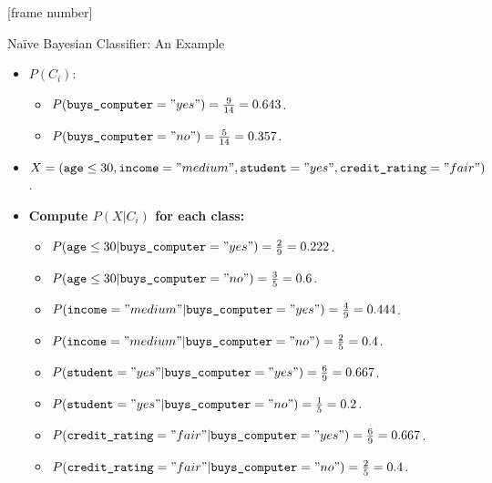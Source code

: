 \documentclass[aspectratio=169,t,table]{beamer}
\begin{document}
  {
    [frame number]
    \begin{frame}{Naïve Bayesian Classifier: An Example}
      \begin{itemize}
        \item $P(C_i)$:
        \begin{itemize}
          \item $P(\texttt{buys\_computer} = "yes") = \frac{9}{14} = 0.643$.
          \item $P(\texttt{buys\_computer} = "no") = \frac{5}{14} = 0.357$.
        \end{itemize}
        \item $X = (\texttt{age} \leq 30 , \texttt{income} = "medium", \texttt{student} = "yes", \texttt{credit\_rating} = "fair")$.
        \item \textbf{Compute $P(X|C_i)$ for each class:}
        \begin{itemize}
          \item $P(\texttt{age} \leq 30 | \texttt{buys\_computer} = "yes") = \frac{2}{9} = 0.222$.
          \item $P(\texttt{age} \leq 30 | \texttt{buys\_computer} = "no") = \frac{3}{5} = 0.6$.
          \item $P(\texttt{income} = "medium" | \texttt{buys\_computer} = "yes") = \frac{4}{9} = 0.444$.
          \item $P(\texttt{income} = "medium" | \texttt{buys\_computer} = "no") = \frac{2}{5} = 0.4$.
          \item $P(\texttt{student} = "yes" | \texttt{buys\_computer} = "yes") = \frac{6}{9} = 0.667$.
          \item $P(\texttt{student} = "yes" | \texttt{buys\_computer} = "no") = \frac{1}{5} = 0.2$.
          \item $P(\texttt{credit\_rating} = "fair" | \texttt{buys\_computer} = "yes") = \frac{6}{9} = 0.667$.
          \item $P(\texttt{credit\_rating} = "fair" | \texttt{buys\_computer} = "no") = \frac{2}{5} = 0.4$.
        \end{itemize}
      \end{itemize}
    \end{frame}
  }
\end{document}
